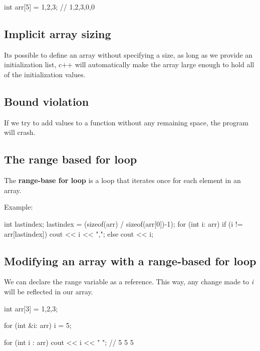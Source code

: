 \documentclass{report}
\begin{document}
   \begin{cppcode}
int arr[5] = {1,2,3}; // {1,2,3,0,0}
   \end{cppcode}
   

   \bigbreak \noindent 
   \subsection{Implicit array sizing}
   \bigbreak \noindent 
   Its possible to define an array without specifying a size, as long as we provide an initialization list, c++ will automatically make the array large enough to hold all of the initialization values.

   \bigbreak \noindent 
   \subsection{Bound violation}
   \bigbreak \noindent 
   If we try to add values to a function without any remaining space, the program will crash.

   \pagebreak \bigbreak \noindent 
   \subsection{The range based for loop}
   \bigbreak \noindent 
   \begin{concept}
 The \textbf{range-base for loop} is a loop that iterates once for each element in an array.
	\end{concept}
   \bigbreak \noindent 
   Example:
   \bigbreak \noindent 
   
    \begin{cppcode}
int lastindex;
lastindex = (sizeof(arr) / sizeof(arr[0])-1);
for (int i: arr)  {
    if (i != arr[lastindex]) {
        cout << i << ",";
    } else {
        cout << i;
    }
}
   \end{cppcode}
   

   \subsection{Modifying an array with a range-based for loop}
   \bigbreak \noindent 
   We can declare the range variable as a reference. This way, any change made to \textit{i} will be reflected in our array.
   \bigbreak \noindent 
   
   \begin{cppcode}
int arr[3] = {1,2,3};

for (int &i: arr)  {
    i = 5;
}

for (int i : arr) cout << i << " "; // 5 5 5
   \end{cppcode}
   
\end{document}
